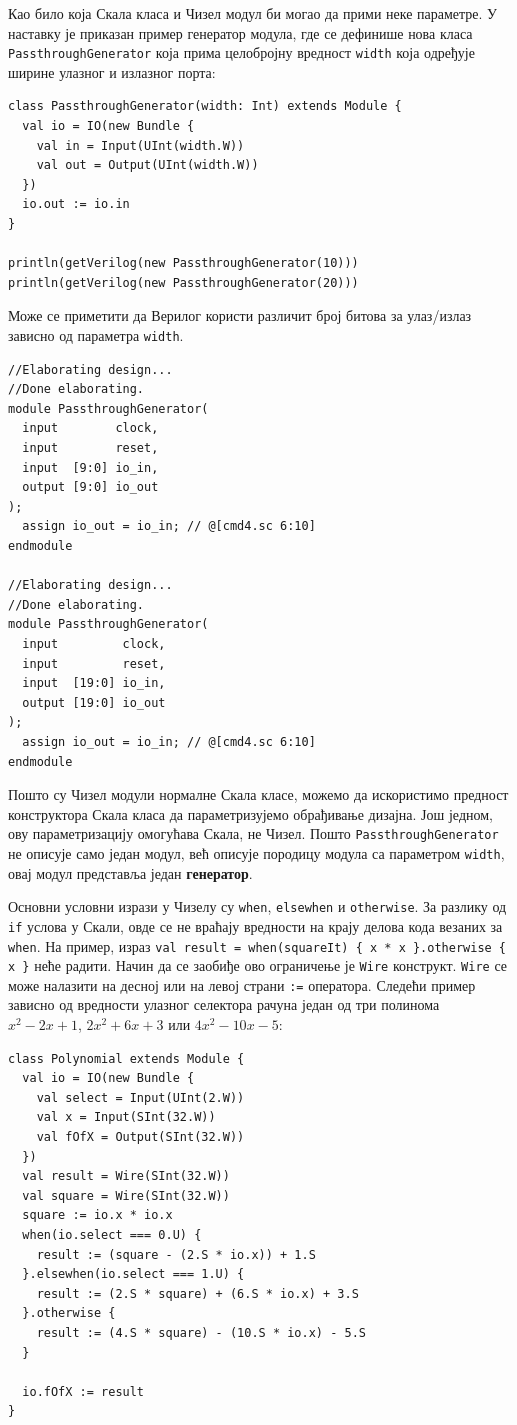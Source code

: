 \documentclass[12pt, a4paper]{article}
\theoremstyle{definition}
\begin{document}
Као било која Скала класа и Чизел модул би могао да прими неке параметре. У наставку је приказан пример генератор модула, где се дефинише нова класа \verb+PassthroughGenerator+ која прима целобројну вредност \verb+width+ која одређује ширине улазног и излазног порта:
\begin{verbatim}
class PassthroughGenerator(width: Int) extends Module {
  val io = IO(new Bundle {
    val in = Input(UInt(width.W))
    val out = Output(UInt(width.W))
  })
  io.out := io.in
}

println(getVerilog(new PassthroughGenerator(10)))
println(getVerilog(new PassthroughGenerator(20)))
\end{verbatim}
Може се приметити да Верилог користи различит број битова за улаз/излаз зависно од параметра \verb+width+.
\begin{verbatim}
//Elaborating design...
//Done elaborating.
module PassthroughGenerator(
  input        clock,
  input        reset,
  input  [9:0] io_in,
  output [9:0] io_out
);
  assign io_out = io_in; // @[cmd4.sc 6:10]
endmodule

//Elaborating design...
//Done elaborating.
module PassthroughGenerator(
  input         clock,
  input         reset,
  input  [19:0] io_in,
  output [19:0] io_out
);
  assign io_out = io_in; // @[cmd4.sc 6:10]
endmodule
\end{verbatim}
Пошто су Чизел модули нормалне Скала класе, можемо да искористимо предност конструктора Скала класа да параметризујемо обрађивање дизајна. Још једном, ову параметризацију омогућава Скала, не Чизел. Пошто \verb+PassthroughGenerator+ не описује само један модул, већ описује породицу модула са параметром \verb+width+, овај модул представља један \textbf{генератор}.

Основни условни изрази у Чизелу су \verb+when+, \verb+elsewhen+ и \verb+otherwise+. За разлику од \verb+if+ услова у Скали, овде се не враћају вредности на крају делова кода везаних за \verb+when+. На пример, израз \verb+val result = when(squareIt) { x * x }.otherwise { x }+ неће радити. Начин да се заобиђе ово ограничење је \verb+Wire+ конструкт. \verb+Wire+ се може налазити на десној или на левој страни \verb+:=+ оператора. Следећи пример зависно од вредности улазног селектора рачуна један од три полинома $x^2 - 2x + 1$, $2x^2 + 6x + 3$ или $4x^2 - 10x - 5$:
\begin{verbatim}
class Polynomial extends Module {
  val io = IO(new Bundle {
    val select = Input(UInt(2.W))
    val x = Input(SInt(32.W))
    val fOfX = Output(SInt(32.W))
  })
  val result = Wire(SInt(32.W))
  val square = Wire(SInt(32.W))
  square := io.x * io.x
  when(io.select === 0.U) {
    result := (square - (2.S * io.x)) + 1.S
  }.elsewhen(io.select === 1.U) {
    result := (2.S * square) + (6.S * io.x) + 3.S
  }.otherwise {
    result := (4.S * square) - (10.S * io.x) - 5.S
  }

  io.fOfX := result
}
\end{verbatim}
\end{document}
